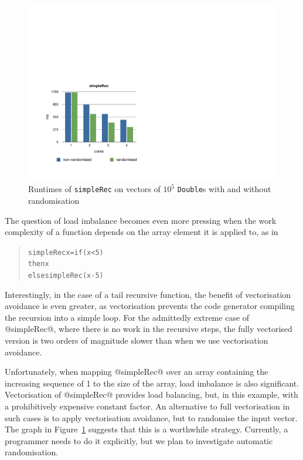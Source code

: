 \begin{figure}
\includegraphics[scale=0.6, trim=0cm 2cm 0cm 9cm, clip]{data/Recursion.pdf}
\caption{Runtimes of \texttt{simpleRec} on vectors of $10^5$ \texttt{Double}s with and without randomisation}
\label{Figure:Recursion}
\end{figure}
%
The question of load imbalance becomes even more pressing when the work complexity of a function depends on the array element it is applied to, as in
%
\begin{quote}\small
\begin{alltt}
simpleRec x = if (x < 5) 
              then x 
              else simpleRec (x - 5)
\end{alltt}
\end{quote}
%
Interestingly, in the case of a tail recursive function, the benefit of vectorisation avoidance is even greater, as vectorisation prevents the code generator compiling the recursion into a simple loop. For the admittedly extreme case of @simpleRec@, where there is no work in the recursive steps, the fully vectorised version is two orders of magnitude slower than when we use vectorisation avoidance.

Unfortunately, when mapping @simpleRec@ over an array containing the increasing sequence of 1 to the size of the array, load imbalance is also significant. Vectorisation of @simpleRec@ provides load balancing, but, in this example, with a prohibitively expensive constant factor. An alternative to full vectorisation in such cases is to apply vectorisation avoidance, but to randomise the input vector. The graph in Figure~\ref{Figure:Recursion} suggests that this is a worthwhile strategy. Currently, a programmer needs to do it explicitly, but we plan to investigate automatic randomisation.

